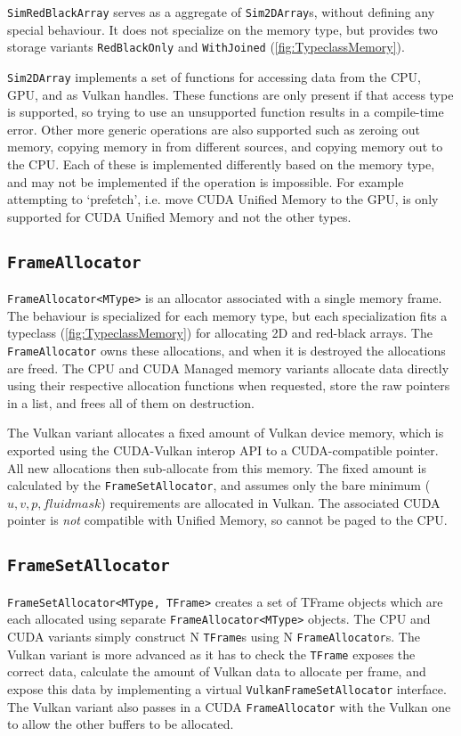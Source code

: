 \texttt{SimRedBlackArray} serves as a aggregate of \texttt{Sim2DArray}s, without defining any special behaviour.
It does not specialize on the memory type, but provides two storage variants \texttt{RedBlackOnly} and \texttt{WithJoined} (\cref{fig:TypeclassMemory}).

\texttt{Sim2DArray} implements a set of functions for accessing data from the CPU, GPU, and as Vulkan handles.
These functions are only present if that access type is supported, so trying to use an unsupported function results in a compile-time error.
Other more generic operations are also supported such as zeroing out memory, copying memory in from different sources, and copying memory out to the CPU.
Each of these is implemented differently based on the memory type, and may not be implemented if the operation is impossible.
For example attempting to `prefetch', i.e. move CUDA Unified Memory to the GPU, is only supported for CUDA Unified Memory and not the other types.

\subsection{\texttt{FrameAllocator}}
\texttt{FrameAllocator<MType>} is an allocator associated with a single memory frame.
The behaviour is specialized for each memory type, but each specialization fits a typeclass (\cref{fig:TypeclassMemory}) for allocating 2D and red-black arrays.
The \texttt{FrameAllocator} owns these allocations, and when it is destroyed the allocations are freed.
The CPU and CUDA Managed memory variants allocate data directly using their respective allocation functions when requested, store the raw pointers in a list, and frees all of them on destruction.

The Vulkan variant allocates a fixed amount of Vulkan device memory, which is exported using the CUDA-Vulkan interop API to a CUDA-compatible pointer.
All new allocations then sub-allocate from this memory.
The fixed amount is calculated by the \texttt{FrameSetAllocator}, and assumes only the bare minimum ($u, v, p, fluidmask$) requirements are allocated in Vulkan.
The associated CUDA pointer is \emph{not} compatible with Unified Memory, so cannot be paged to the CPU.

\subsection{\texttt{FrameSetAllocator}}
\texttt{FrameSetAllocator<MType, TFrame>} creates a set of TFrame objects which are each allocated using separate \texttt{FrameAllocator<MType>} objects.
The CPU and CUDA variants simply construct N \texttt{TFrame}s using N \texttt{FrameAllocator}s.
The Vulkan variant is more advanced as it has to check the \texttt{TFrame} exposes the correct data, calculate the amount of Vulkan data to allocate per frame, and expose this data by implementing a virtual \texttt{VulkanFrameSetAllocator} interface.
The Vulkan variant also passes in a CUDA \texttt{FrameAllocator} with the Vulkan one to allow the other buffers to be allocated.

